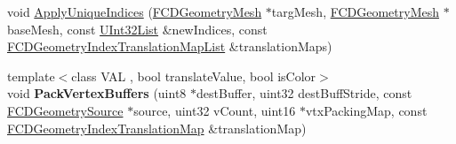 \begin{DoxyCompactItemize}
\item 
void \hyperlink{namespaceFCDGeometryPolygonsTools_a2b715708a01eab1beb8e3b29de70dd0d}{ApplyUniqueIndices} (\hyperlink{classFCDGeometryMesh}{FCDGeometryMesh} $\ast$targMesh, \hyperlink{classFCDGeometryMesh}{FCDGeometryMesh} $\ast$baseMesh, const \hyperlink{classfm_1_1vector}{UInt32List} \&newIndices, const \hyperlink{classfm_1_1pvector}{FCDGeometryIndexTranslationMapList} \&translationMaps)
\item 
\hypertarget{namespaceFCDGeometryPolygonsTools_a4984fab27cf1ea08f70b33345bc8a589}{
{\footnotesize template$<$class VAL , bool translateValue, bool isColor$>$ }\\void {\bfseries PackVertexBuffers} (uint8 $\ast$destBuffer, uint32 destBuffStride, const \hyperlink{classFCDGeometrySource}{FCDGeometrySource} $\ast$source, uint32 vCount, uint16 $\ast$vtxPackingMap, const \hyperlink{classfm_1_1map}{FCDGeometryIndexTranslationMap} \&translationMap)}
\label{namespaceFCDGeometryPolygonsTools_a4984fab27cf1ea08f70b33345bc8a589}


\end{DoxyCompactItemize}
